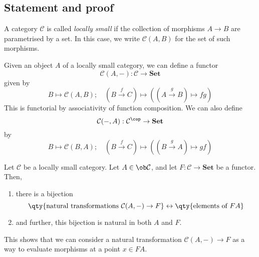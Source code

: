 \subsection{Statement and proof}
\begin{definition}
    A category \( \mathcal C \) is called \emph{locally small} if the collection of morphisms \( A \to B \) are parametrised by a set.
    In this case, we write \( \mathcal C(A, B) \) for the set of such morphisms.
\end{definition}
Given an object \( A \) of a locally small category, we can define a functor
\[ \mathcal C(A, -) : \mathcal C \to \mathbf{Set} \]
given by
\[ B \mapsto \mathcal C(A, B);\quad (B \xrightarrow f C) \mapsto ((A \xrightarrow g B) \mapsto f g) \]
This is functorial by associativity of function composition.
We can also define
\[ \mathcal C(-, A) : \mathcal C^\cop \to \mathbf{Set} \]
by
\[ B \mapsto \mathcal C(B, A);\quad (B \xrightarrow f C) \mapsto ((B \xrightarrow g A) \mapsto g f) \]
\begin{lemma}
    Let \( \mathcal C \) be a locally small category.
    Let \( A \in \ob \mathcal C \), and let \( F : \mathcal C \to \mathbf{Set} \) be a functor.
    Then,
    \begin{enumerate}
        \item there is a bijection
        \[ \qty{\text{natural transformations } \mathcal C(A, -) \to F} \leftrightarrow \qty{\text{elements of } F A} \]
        \item and further, this bijection is natural in both \( A \) and \( F \).
    \end{enumerate}
\end{lemma}
This shows that we can consider a natural transformation \( \mathcal C(A, -) \to F \) as a way to evaluate morphisms at a point \( x \in F A \).
